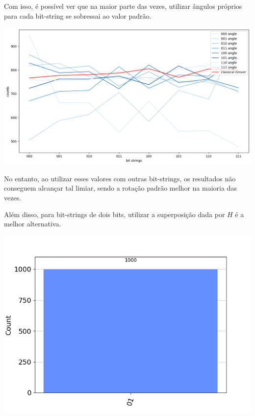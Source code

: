 \documentclass{article}
\begin{document}
Com isso, é possível ver que na maior parte das vezes, utilizar ângulos próprios para cada bit-string se sobressai ao valor padrão.

\begin{center}
	\includegraphics[scale=0.4]{new-grover-test-different-bit-strings-with-optimal-angles.png}
	\label{fig:best-angles-diff-bit-strings-grover}
\end{center}

No entanto, ao utilizar esses valores com outras bit-strings, os resultados não conseguem alcançar tal limiar, sendo a rotação padrão  melhor na maioria das vezes.

Além disso, para bit-strings de dois bits, utilizar a superposição dada por $H$ é a melhor alternativa.

\begin{center}
	\includegraphics[scale=0.5]{classical_grover_for_1_bit_strings_l2_outcomes.png}
	\label{fig:l2-grover-classical-outcomes}
\end{center}
\end{document}
